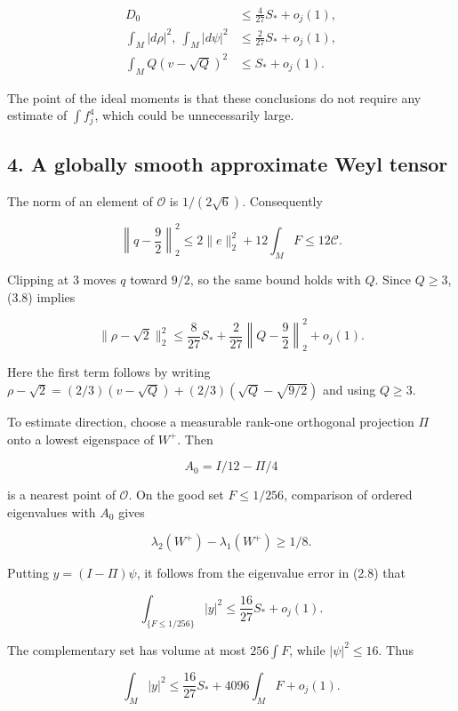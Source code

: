\documentclass[
  10pt,
]{article}
\begin{document}
\[
 \begin{aligned}
 D_0&\le\frac4{27}S_*+o_j(1),\\
 \int_M|d\rho|^2,\ \int_M|d\psi|^2
     &\le\frac2{27}S_*+o_j(1),\\
 \int_MQ(v-\sqrt Q)^2&\le S_*+o_j(1).
 \end{aligned}                                              \tag{3.9}
\]

The point of the ideal moments is that these conclusions do not require
any estimate of \(\int f_j^4\), which could be unnecessarily large.

\hypertarget{a-globally-smooth-approximate-weyl-tensor}{%
\subsection{4. A globally smooth approximate Weyl
tensor}\label{a-globally-smooth-approximate-weyl-tensor}}

The norm of an element of \(\mathcal O\) is \(1/(2\sqrt6)\).
Consequently

\[
 \left\|q-\frac92\right\|_2^2
       \le2\|e\|_2^2+12\int_MF\le12\mathcal C.           \tag{4.1}
\]

Clipping at \(3\) moves \(q\) toward \(9/2\), so the same bound holds
with \(Q\). Since \(Q\ge3\), (3.8) implies

\[
 \|\rho-\sqrt2\|_2^2
  \le\frac8{27}S_*+\frac2{27}\left\|Q-\frac92\right\|_2^2+o_j(1).
 \tag{4.2}
\]

Here the first term follows by writing
\(\rho-\sqrt2=(2/3)(v-\sqrt Q)+(2/3)(\sqrt Q-\sqrt{9/2})\) and using
\(Q\ge3\).

To estimate direction, choose a measurable rank-one orthogonal
projection \(\Pi\) onto a lowest eigenspace of \(W^+\). Then

\[
                  A_0=I/12-\Pi/4
\]

is a nearest point of \(\mathcal O\). On the good set \(F\le1/256\),
comparison of ordered eigenvalues with \(A_0\) gives

\[
                   \lambda_2(W^+)-\lambda_1(W^+)\ge1/8.
\]

Putting \(y=(I-\Pi)\psi\), it follows from the eigenvalue error in (2.8)
that

\[
 \int_{\{F\le1/256\}}|y|^2\le\frac{16}{27}S_*+o_j(1).
\]

The complementary set has volume at most \(256\int F\), while
\(|\psi|^2\le16\). Thus

\[
                 \int_M|y|^2\le\frac{16}{27}S_*+4096\int_MF+o_j(1).
 \tag{4.3}
\]
\end{document}
